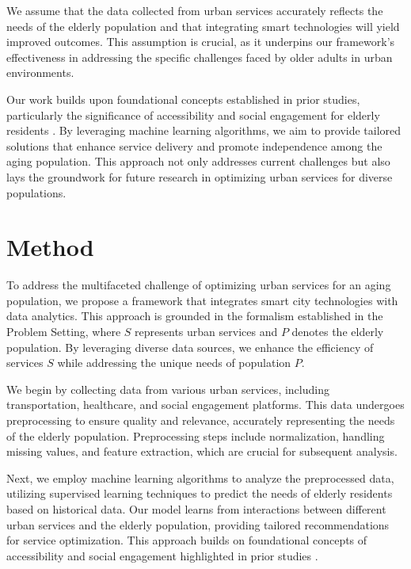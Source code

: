 \documentclass{article} %
\begin{document}
We assume that the data collected from urban services accurately reflects the needs of the elderly population and that integrating smart technologies will yield improved outcomes. This assumption is crucial, as it underpins our framework's effectiveness in addressing the specific challenges faced by older adults in urban environments.

Our work builds upon foundational concepts established in prior studies, particularly the significance of accessibility and social engagement for elderly residents \citep{power2022grokking}. By leveraging machine learning algorithms, we aim to provide tailored solutions that enhance service delivery and promote independence among the aging population. This approach not only addresses current challenges but also lays the groundwork for future research in optimizing urban services for diverse populations.

\section{Method}
\label{sec:method}
To address the multifaceted challenge of optimizing urban services for an aging population, we propose a framework that integrates smart city technologies with data analytics. This approach is grounded in the formalism established in the Problem Setting, where \( S \) represents urban services and \( P \) denotes the elderly population. By leveraging diverse data sources, we enhance the efficiency of services \( S \) while addressing the unique needs of population \( P \).

We begin by collecting data from various urban services, including transportation, healthcare, and social engagement platforms. This data undergoes preprocessing to ensure quality and relevance, accurately representing the needs of the elderly population. Preprocessing steps include normalization, handling missing values, and feature extraction, which are crucial for subsequent analysis.

Next, we employ machine learning algorithms to analyze the preprocessed data, utilizing supervised learning techniques to predict the needs of elderly residents based on historical data. Our model learns from interactions between different urban services and the elderly population, providing tailored recommendations for service optimization. This approach builds on foundational concepts of accessibility and social engagement highlighted in prior studies \citep{power2022grokking}.
\end{document}

